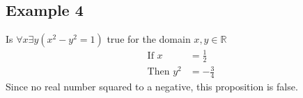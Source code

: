 \documentclass{article}
\theoremstyle{mytheoremstyle}
\theoremstyle{mytheoremstyle}
\theoremstyle{myproblemstyle}
\begin{document}
    \subsection*{Example 4}
    Is $\forall x \exists y (x^2-y^2 = 1)$ true for the domain $x,y\in \mathbb{R}$
    \begin{align*}
        \text{If } x &= \frac{1}{2} \\
        \text{Then } y^2 &= -\frac{3}{4}
    \end{align*}
    Since no real number squared to a negative, this proposition is false.
\end{document}

